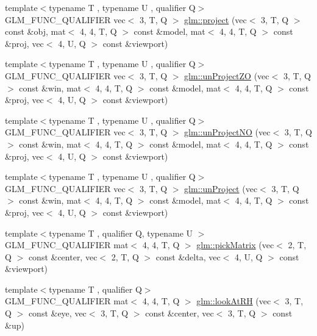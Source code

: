 \begin{DoxyCompactItemize}
\item 
{\footnotesize template$<$typename T , typename U , qualifier Q$>$ }\\G\+L\+M\+\_\+\+F\+U\+N\+C\+\_\+\+Q\+U\+A\+L\+I\+F\+I\+ER vec$<$ 3, T, Q $>$ \hyperlink{group__gtc__matrix__transform_gaf36e96033f456659e6705472a06b6e11}{glm\+::project} (vec$<$ 3, T, Q $>$ const \&obj, mat$<$ 4, 4, T, Q $>$ const \&model, mat$<$ 4, 4, T, Q $>$ const \&proj, vec$<$ 4, U, Q $>$ const \&viewport)
\item 
{\footnotesize template$<$typename T , typename U , qualifier Q$>$ }\\G\+L\+M\+\_\+\+F\+U\+N\+C\+\_\+\+Q\+U\+A\+L\+I\+F\+I\+ER vec$<$ 3, T, Q $>$ \hyperlink{group__gtc__matrix__transform_gade5136413ce530f8e606124d570fba32}{glm\+::un\+Project\+ZO} (vec$<$ 3, T, Q $>$ const \&win, mat$<$ 4, 4, T, Q $>$ const \&model, mat$<$ 4, 4, T, Q $>$ const \&proj, vec$<$ 4, U, Q $>$ const \&viewport)
\item 
{\footnotesize template$<$typename T , typename U , qualifier Q$>$ }\\G\+L\+M\+\_\+\+F\+U\+N\+C\+\_\+\+Q\+U\+A\+L\+I\+F\+I\+ER vec$<$ 3, T, Q $>$ \hyperlink{group__gtc__matrix__transform_gae089ba9fc150ff69c252a20e508857b5}{glm\+::un\+Project\+NO} (vec$<$ 3, T, Q $>$ const \&win, mat$<$ 4, 4, T, Q $>$ const \&model, mat$<$ 4, 4, T, Q $>$ const \&proj, vec$<$ 4, U, Q $>$ const \&viewport)
\item 
{\footnotesize template$<$typename T , typename U , qualifier Q$>$ }\\G\+L\+M\+\_\+\+F\+U\+N\+C\+\_\+\+Q\+U\+A\+L\+I\+F\+I\+ER vec$<$ 3, T, Q $>$ \hyperlink{group__gtc__matrix__transform_ga36641e5d60f994e01c3d8f56b10263d2}{glm\+::un\+Project} (vec$<$ 3, T, Q $>$ const \&win, mat$<$ 4, 4, T, Q $>$ const \&model, mat$<$ 4, 4, T, Q $>$ const \&proj, vec$<$ 4, U, Q $>$ const \&viewport)
\item 
{\footnotesize template$<$typename T , qualifier Q, typename U $>$ }\\G\+L\+M\+\_\+\+F\+U\+N\+C\+\_\+\+Q\+U\+A\+L\+I\+F\+I\+ER mat$<$ 4, 4, T, Q $>$ \hyperlink{group__gtc__matrix__transform_gaf6b21eadb7ac2ecbbe258a9a233b4c82}{glm\+::pick\+Matrix} (vec$<$ 2, T, Q $>$ const \&center, vec$<$ 2, T, Q $>$ const \&delta, vec$<$ 4, U, Q $>$ const \&viewport)
\item 
{\footnotesize template$<$typename T , qualifier Q$>$ }\\G\+L\+M\+\_\+\+F\+U\+N\+C\+\_\+\+Q\+U\+A\+L\+I\+F\+I\+ER mat$<$ 4, 4, T, Q $>$ \hyperlink{group__gtc__matrix__transform_gacfa12c8889c754846bc20c65d9b5c701}{glm\+::look\+At\+RH} (vec$<$ 3, T, Q $>$ const \&eye, vec$<$ 3, T, Q $>$ const \&center, vec$<$ 3, T, Q $>$ const \&up)

\end{DoxyCompactItemize}
